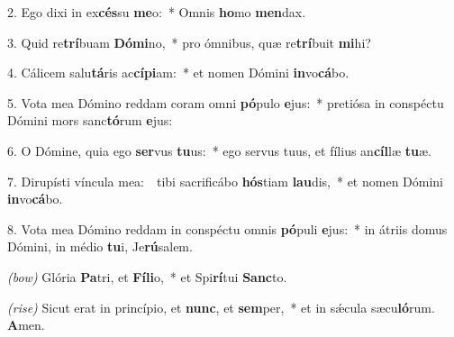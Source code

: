 2. Ego dixi in ex\textbf{cés}su \textbf{me}o:~* Omnis \textbf{ho}mo \textbf{men}dax.

3. Quid re\textbf{trí}buam \textbf{Dó}\textbf{mi}no,~* pro ómnibus, quæ re\textbf{trí}buit \textbf{mi}hi?

4. Cálicem salu\textbf{tá}ris ac\textbf{cí}\textbf{pi}am:~* et nomen Dómini \textbf{in}vo\textbf{cá}bo.

5. Vota mea Dómino reddam coram omni \textbf{pó}pulo \textbf{e}jus:~* pretiósa in conspéctu Dómini mors sanc\textbf{tó}rum \textbf{e}jus:

6. O Dómine, quia ego \textbf{ser}vus \textbf{tu}us:~* ego servus tuus, et fílius an\textbf{cíl}læ \textbf{tu}æ.

7. Dirupísti víncula mea:~\GreDagger\ tibi sacrificábo \textbf{hós}tiam \textbf{lau}dis,~* et nomen Dómini \textbf{in}vo\textbf{cá}bo.

8. Vota mea Dómino reddam in conspéctu omnis \textbf{pó}puli \textbf{e}jus:~* in átriis domus Dómini, in médio \textbf{tu}i, Je\textbf{rú}salem.

\textit{(bow)} Glória \textbf{Pa}tri, et \textbf{Fí}\textbf{li}o,~* et Spi\textbf{rí}tui \textbf{Sanc}to.

\textit{(rise)} Sicut erat in princípio, et \textbf{nunc}, et \textbf{sem}per,~* et in s\'{\ae}cula sæcu\textbf{ló}rum. \textbf{A}men.